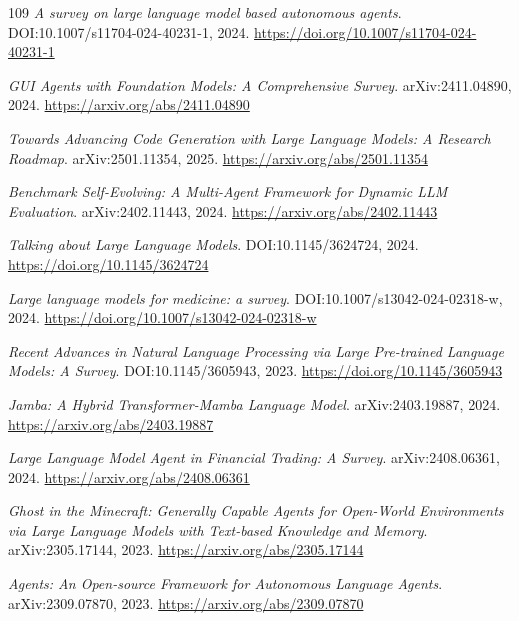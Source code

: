 \documentclass[11pt,a4paper]{article}
\begin{document}
\begin{thebibliography}{109}
\newblock \emph{A survey on large language model based autonomous agents}.
\newblock DOI:10.1007/s11704-024-40231-1, 2024.
\newblock \url{https://doi.org/10.1007/s11704-024-40231-1}

\newblock \emph{GUI Agents with Foundation Models: A Comprehensive Survey}.
\newblock arXiv:2411.04890, 2024.
\newblock \url{https://arxiv.org/abs/2411.04890}

\newblock \emph{Towards Advancing Code Generation with Large Language Models: A Research Roadmap}.
\newblock arXiv:2501.11354, 2025.
\newblock \url{https://arxiv.org/abs/2501.11354}

\newblock \emph{Benchmark Self-Evolving: A Multi-Agent Framework for Dynamic LLM Evaluation}.
\newblock arXiv:2402.11443, 2024.
\newblock \url{https://arxiv.org/abs/2402.11443}

\newblock \emph{Talking about Large Language Models}.
\newblock DOI:10.1145/3624724, 2024.
\newblock \url{https://doi.org/10.1145/3624724}

\newblock \emph{Large language models for medicine: a survey}.
\newblock DOI:10.1007/s13042-024-02318-w, 2024.
\newblock \url{https://doi.org/10.1007/s13042-024-02318-w}

\newblock \emph{Recent Advances in Natural Language Processing via Large Pre-trained Language Models: A Survey}.
\newblock DOI:10.1145/3605943, 2023.
\newblock \url{https://doi.org/10.1145/3605943}

\newblock \emph{Jamba: A Hybrid Transformer-Mamba Language Model}.
\newblock arXiv:2403.19887, 2024.
\newblock \url{https://arxiv.org/abs/2403.19887}

\newblock \emph{Large Language Model Agent in Financial Trading: A Survey}.
\newblock arXiv:2408.06361, 2024.
\newblock \url{https://arxiv.org/abs/2408.06361}

\newblock \emph{Ghost in the Minecraft: Generally Capable Agents for Open-World Environments via Large Language Models with Text-based Knowledge and Memory}.
\newblock arXiv:2305.17144, 2023.
\newblock \url{https://arxiv.org/abs/2305.17144}

\newblock \emph{Agents: An Open-source Framework for Autonomous Language Agents}.
\newblock arXiv:2309.07870, 2023.
\newblock \url{https://arxiv.org/abs/2309.07870}


\end{thebibliography}
\end{document}
